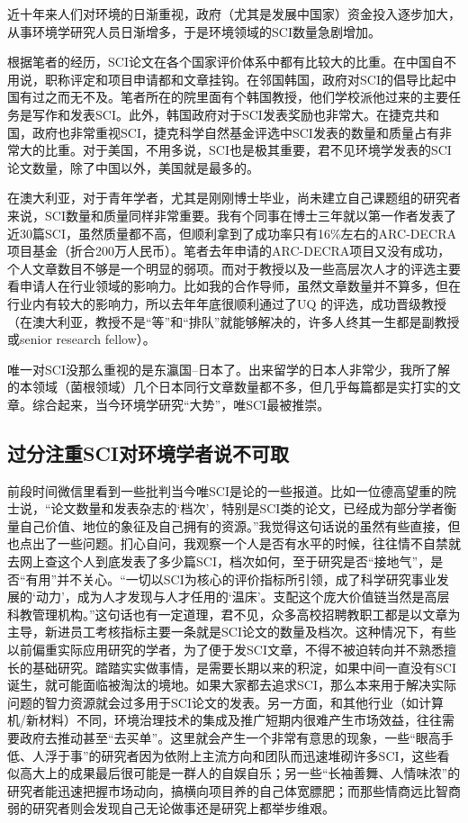 \documentclass[
]{book}
\begin{document}
近十年来人们对环境的日渐重视，政府（尤其是发展中国家）资金投入逐步加大，从事环境学研究人员日渐增多，于是环境领域的SCI数量急剧增加。

根据笔者的经历，SCI论文在各个国家评价体系中都有比较大的比重。在中国自不用说，职称评定和项目申请都和文章挂钩。在邻国韩国，政府对SCI的倡导比起中国有过之而无不及。笔者所在的院里面有个韩国教授，他们学校派他过来的主要任务是写作和发表SCI。此外，韩国政府对于SCI发表奖励也非常大。在捷克共和国，政府也非常重视SCI，捷克科学自然基金评选中SCI发表的数量和质量占有非常大的比重。对于美国，不用多说，SCI也是极其重要，君不见环境学发表的SCI论文数量，除了中国以外，美国就是最多的。

在澳大利亚，对于青年学者，尤其是刚刚博士毕业，尚未建立自己课题组的研究者来说，SCI数量和质量同样非常重要。我有个同事在博士三年就以第一作者发表了近30篇SCI，虽然质量都不高，但顺利拿到了成功率只有16\%左右的ARC-DECRA项目基金（折合200万人民币）。笔者去年申请的ARC-DECRA项目又没有成功，个人文章数目不够是一个明显的弱项。而对于教授以及一些高层次人才的评选主要看申请人在行业领域的影响力。比如我的合作导师，虽然文章数量并不算多，但在行业内有较大的影响力，所以去年年底很顺利通过了UQ 的评选，成功晋级教授（在澳大利亚，教授不是``等''和``排队''就能够解决的，许多人终其一生都是副教授或senior research fellow）。

唯一对SCI没那么重视的是东瀛国--日本了。出来留学的日本人非常少，我所了解的本领域（菌根领域）几个日本同行文章数量都不多，但几乎每篇都是实打实的文章。综合起来，当今环境学研究``大势''，唯SCI最被推崇。

\hypertarget{ux8fc7ux5206ux6ce8ux91cdsciux5bf9ux73afux5883ux5b66ux8005ux8bf4ux4e0dux53efux53d6}{%
\subsection{过分注重SCI对环境学者说不可取}\label{ux8fc7ux5206ux6ce8ux91cdsciux5bf9ux73afux5883ux5b66ux8005ux8bf4ux4e0dux53efux53d6}}

前段时间微信里看到一些批判当今唯SCI是论的一些报道。比如一位德高望重的院士说，``论文数量和发表杂志的`档次'，特别是SCI类的论文，已经成为部分学者衡量自己价值、地位的象征及自己拥有的资源。''我觉得这句话说的虽然有些直接，但也点出了一些问题。扪心自问，我观察一个人是否有水平的时候，往往情不自禁就去网上查这个人到底发表了多少篇SCI，档次如何，至于研究是否``接地气''，是否``有用''并不关心。``一切以SCI为核心的评价指标所引领，成了科学研究事业发展的`动力'，成为人才发现与人才任用的`温床'。支配这个庞大价值链当然是高层科教管理机构。''这句话也有一定道理，君不见，众多高校招聘教职工都是以文章为主导，新进员工考核指标主要一条就是SCI论文的数量及档次。这种情况下，有些以前偏重实际应用研究的学者，为了便于发SCI文章，不得不被迫转向并不熟悉擅长的基础研究。踏踏实实做事情，是需要长期以来的积淀，如果中间一直没有SCI诞生，就可能面临被淘汰的境地。如果大家都去追求SCI，那么本来用于解决实际问题的智力资源就会过多用于SCI论文的发表。另一方面，和其他行业（如计算机/新材料）不同，环境治理技术的集成及推广短期内很难产生市场效益，往往需要政府去推动甚至``去买单''。这里就会产生一个非常有意思的现象，一些``眼高手低、人浮于事''的研究者因为依附上主流方向和团队而迅速堆砌许多SCI，这些看似高大上的成果最后很可能是一群人的自娱自乐；另一些``长袖善舞、人情味浓''的研究者能迅速把握市场动向，搞横向项目养的自己体宽膘肥；而那些情商远比智商弱的研究者则会发现自己无论做事还是研究上都举步维艰。
\end{document}
